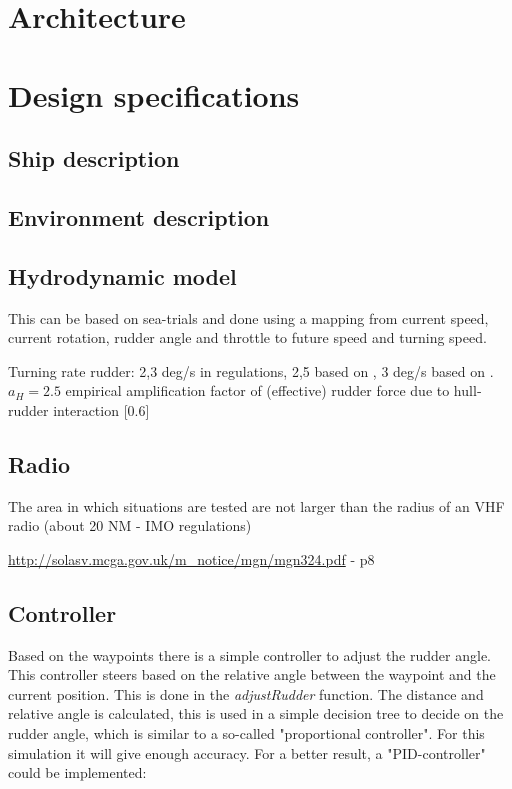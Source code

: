 \section{Architecture}

\section{Design specifications}

\subsection{Ship description}

\subsection{Environment description}

\subsection{Hydrodynamic model}
\label{apps:hydro-model}
This can be based on sea-trials and done using a mapping from current speed, current rotation, rudder angle and throttle to future speed and turning speed.

Turning rate rudder: 2,3 deg/s in regulations, 2,5 based on \cite{Artyszuk2016}, 3 deg/s based on \cite{Molland2007}.
$a_H = 2.5$ empirical amplification factor of (effective) rudder force due to hull‐rudder interaction [0.6]


\subsection{Radio}
The area in which situations are tested are not larger than the radius of an VHF radio (about 20 NM - IMO regulations)

\url{http://solasv.mcga.gov.uk/m_notice/mgn/mgn324.pdf} - p8

\subsection{Controller}
Based on the waypoints there is a simple controller to adjust the rudder angle. This controller steers based on the relative angle between the waypoint and the current position. This is done in the \emph{adjustRudder} function. The distance and relative angle is calculated, this is used in a simple decision tree to decide on the rudder angle, which is similar to a so-called "proportional controller". For this simulation it will give enough accuracy. For a better result, a "PID-controller" could be implemented:

